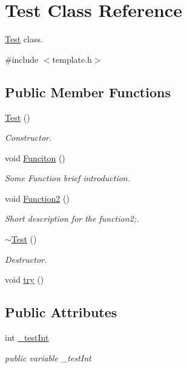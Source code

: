 \hypertarget{class_test}{}\section{Test Class Reference}
\label{class_test}


\hyperlink{class_test}{Test} class.  




{\ttfamily \#include $<$template.\+h$>$}

\subsection*{Public Member Functions}
\begin{DoxyCompactItemize}
\item 
\hyperlink{class_test_a99f2bbfac6c95612322b0f10e607ebe5}{Test} ()\hypertarget{class_test_a99f2bbfac6c95612322b0f10e607ebe5}{}\label{class_test_a99f2bbfac6c95612322b0f10e607ebe5}

\begin{DoxyCompactList}\small\item\em Constructor. \end{DoxyCompactList}\item 
void \hyperlink{class_test_a1370e70756dfa38c03d7d9d5a0cf2865}{Funciton} ()
\begin{DoxyCompactList}\small\item\em Some Function brief introduction. \end{DoxyCompactList}\item 
void \hyperlink{class_test_a910e82b6de9fb1f90af9314c218b3400}{Function2} ()
\begin{DoxyCompactList}\small\item\em Short description for the function2;. \end{DoxyCompactList}\item 
\hyperlink{class_test_a2b0a62f1e667bbe8d8cb18d785bfa991}{$\sim$\+Test} ()\hypertarget{class_test_a2b0a62f1e667bbe8d8cb18d785bfa991}{}\label{class_test_a2b0a62f1e667bbe8d8cb18d785bfa991}

\begin{DoxyCompactList}\small\item\em Destructor. \end{DoxyCompactList}\item 
void \hyperlink{class_test_a0dd81d136e80a749e019a4ab880311bf}{try} ()
\end{DoxyCompactItemize}
\subsection*{Public Attributes}
\begin{DoxyCompactItemize}
\item 
int \hyperlink{class_test_ac60c1b4f313472ddf96162e16245f82f}{\+\_\+test\+Int}\hypertarget{class_test_ac60c1b4f313472ddf96162e16245f82f}{}\label{class_test_ac60c1b4f313472ddf96162e16245f82f}

\begin{DoxyCompactList}\small\item\em public variable \+\_\+test\+Int \end{DoxyCompactList}\end{DoxyCompactItemize}
